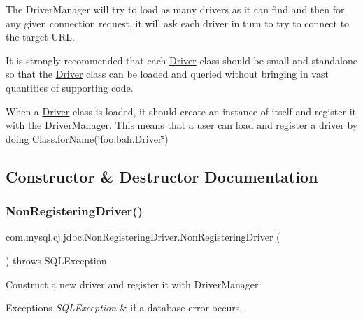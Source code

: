 The Driver\+Manager will try to load as many drivers as it can find and then for any given connection request, it will ask each driver in turn to try to connect to the target U\+RL. 

It is strongly recommended that each \mbox{\hyperlink{classcom_1_1mysql_1_1cj_1_1jdbc_1_1_driver}{Driver}} class should be small and standalone so that the \mbox{\hyperlink{classcom_1_1mysql_1_1cj_1_1jdbc_1_1_driver}{Driver}} class can be loaded and queried without bringing in vast quantities of supporting code. 

When a \mbox{\hyperlink{classcom_1_1mysql_1_1cj_1_1jdbc_1_1_driver}{Driver}} class is loaded, it should create an instance of itself and register it with the Driver\+Manager. This means that a user can load and register a driver by doing Class.\+for\+Name(\char`\"{}foo.\+bah.\+Driver\char`\"{}) 

\subsection{Constructor \& Destructor Documentation}
\mbox{\label{classcom_1_1mysql_1_1cj_1_1jdbc_1_1_non_registering_driver_a43d2c5741a06d37722f12c74d34cad9c}} 
\subsubsection{\texorpdfstring{Non\+Registering\+Driver()}{NonRegisteringDriver()}}
{\footnotesize\ttfamily com.\+mysql.\+cj.\+jdbc.\+Non\+Registering\+Driver.\+Non\+Registering\+Driver (\begin{DoxyParamCaption}{ }\end{DoxyParamCaption}) throws S\+Q\+L\+Exception}

Construct a new driver and register it with Driver\+Manager


\begin{DoxyExceptions}{Exceptions}
{\em S\+Q\+L\+Exception} & if a database error occurs. \\
\hline
\end{DoxyExceptions}


